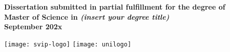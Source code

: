 \begin{titlepage}
		
		\begin{center}\bf
		    Dissertation submitted in partial fulfillment for the degree of \\
		    Master of Science in \textit{(insert your degree title)} \\[1em]  
		\hfill \break
		    \large September 202x\\
	   \end{center} 	
		
		
		
		\vfill
		\texttt{[image: svip-logo]} 
		\hfill
		\texttt{[image: unilogo]}
		
		
		\vfill %
		
	\end{titlepage}